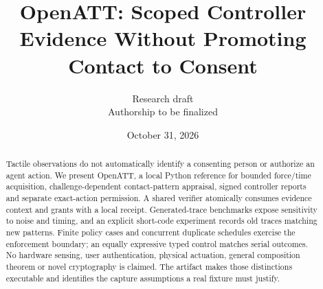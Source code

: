 \documentclass[letterpaper,twocolumn,10pt]{article}
\title{OpenATT: Scoped Controller Evidence Without Promoting Contact to Consent}
\author{Research draft\\Authorship to be finalized}
\date{October 31, 2026}
\begin{document}
\raggedbottom
\maketitle
\begin{abstract}
Tactile observations do not automatically identify a consenting person or authorize an agent action. We present OpenATT, a local Python reference for bounded force/time acquisition, challenge-dependent contact-pattern appraisal, signed controller reports and separate exact-action permission. A shared verifier atomically consumes evidence context and grants with a local receipt. Generated-trace benchmarks expose sensitivity to noise and timing, and an explicit short-code experiment records old traces matching new patterns. Finite policy cases and concurrent duplicate schedules exercise the enforcement boundary; an equally expressive typed control matches serial outcomes. No hardware sensing, user authentication, physical actuation, general composition theorem or novel cryptography is claimed. The artifact makes those distinctions executable and identifies the capture assumptions a real fixture must justify.
\end{abstract}








\appendix

\end{document}
